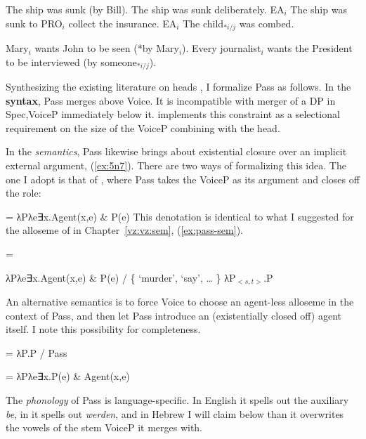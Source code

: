 \begin{exe}
\begin{xlist}
 \begin{exe}
\ex  \label{ex:pass-by-en}The ship was sunk (by Bill). 
\ex  \label{ex:pass-adv-en}The ship was sunk deliberately. 
\ex  \label{ex:pass-pro-en}EA$_i$ The ship was sunk to PRO$_i$ collect the insurance. 
\ex  \label{ex:pass-dre-en}EA$_i$ The child$_{*i/j}$ was combed. 
\ex  \label{ex:pass-bind-en} 
 \begin{xlist} 
 	\ex  Mary$_i$ wants John to be seen (*by Mary$_i$). 
 	\ex  Every journalist$_i$ wants the President to be interviewed (by someone$_{*i/j}$). 
 \z
\z 

Synthesizing the existing literature on  heads \citep{bruening13,layering15}, I formalize Pass as follows. In the \textbf{syntax}, Pass merges above Voice. It is incompatible with merger of a DP in Spec,VoiceP immediately below it. \cite{bruening13} implements this constraint as a selectional requirement on the size of the VoiceP combining with the  head.

In the \textit{semantics}, Pass likewise brings about existential closure over an implicit external argument, (\ref{ex:5n7}). There are two ways of formalizing this idea. The one I adopt is that of \cite{bruening13}, where Pass takes the VoiceP as its argument and closes off the  role:

 \begin{exe}
\ex  \label{ex:5n7} = λPλe∃x.Agent(x,e) \& P(e) 
 \z 
This denotation is identical to what I suggested for the  alloseme of {\vz} in Chapter~\ref{vz:vz:sem}, (\ref{ex:pass-sem}).
 \begin{exe}
	\ex  \label{ex:pass-sem}\denote{\vz} = 
	\begin{xlist}
		\ex λPλe∃x.Agent(x,e) \& P(e) / \{ `murder',  ‘say’, {\dots} \} 
		\ex λP$_{<s,t>}$.P
		\z
	\z 

An alternative semantics is to force Voice to choose an agent-less alloseme in the context of Pass, and then let Pass introduce an (existentially closed off) agent itself. I note this possibility for completeness.

 \begin{exe}
\ex  {} = λP.P / Pass \trace 

\ex  {} = λPλe∃x.P(e) \& Agent(x,e) 
 \z 

The \textit{phonology} of Pass is language-specific. In English it spells out the auxiliary \emph{be}, in  it spells out \emph{werden}, and in Hebrew I will claim below than it overwrites the vowels of the stem VoiceP it merges with.



\end{exe}
\end{xlist}
\end{exe}
\end{exe}
\end{xlist}
\end{exe}
\end{xlist}
\end{exe}
